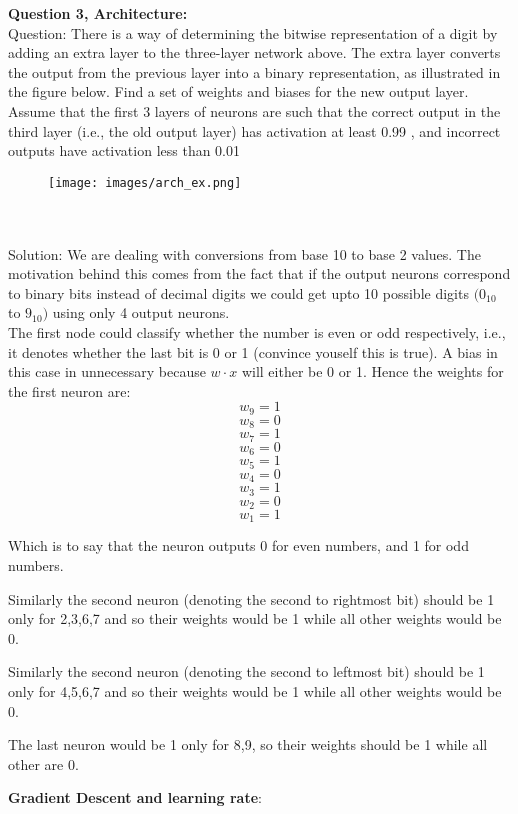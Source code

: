 \documentclass[18pt]{article}
\begin{document}
\textbf{Question 3, Architecture:}\\
Question: There is a way of determining the bitwise representation of a digit by adding an extra layer to the three-layer network above. The extra layer converts the output from the previous layer into a binary representation, as illustrated in the figure below. Find a set of weights and biases for the new output layer. Assume that the first 3
 layers of neurons are such that the correct output in the third layer (i.e., the old output layer) has activation at least 0.99
, and incorrect outputs have activation less than 0.01
\begin{figure}[htbp]
    \centering
    \texttt{[image: images/arch\_ex.png]}
    \label{fig:my_label}
\end{figure}
\\
\\
Solution: We are dealing with conversions from base 10 to base 2 values. The motivation behind this comes from the fact that if the output neurons correspond to binary bits instead of decimal digits we could get upto 10 possible digits $(0_{10}$ to $9_{10})$ using only 4 output neurons.\\
The first node could classify whether the number is even or odd respectively, i.e., it denotes whether the last bit is 0 or 1 (convince youself this is true). A bias in this case in unnecessary because $w\cdot x$ will either be 0 or 1. Hence the weights for the first neuron are:
$$w_9=1$$
$$w_8=0$$
$$w_7=1$$
$$w_6=0$$
$$w_5=1$$
$$w_4=0$$
$$w_3=1$$
$$w_2=0$$
$$w_1=1$$

Which is to say that the neuron outputs 0 for even numbers, and 1 for odd numbers.

Similarly the second neuron (denoting the second to rightmost bit) should be 1 only for {2,3,6,7} and so their weights would be 1 while all other weights would be 0.

Similarly the second neuron (denoting the second to leftmost bit) should be 1 only for {4,5,6,7} and so their weights would be 1 while all other weights would be 0.

The last neuron would be 1 only for {8,9}, so their weights should be 1 while all other are 0.

\bigbreak
\textbf{Gradient Descent and learning rate}:
\end{document}
